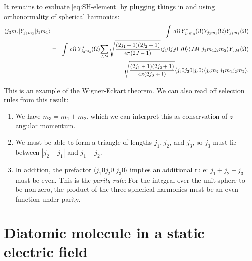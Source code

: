 \documentclass{article}
\theoremstyle{definition}
\newcommand{\nn}{\nonumber}
\newcommand{\f}[2]{\frac{#1}{#2}}
\begin{document}
\noindent It remains to evaluate \eqref{eq:SH-element} by plugging things in and using orthonormality of spherical harmonics:
\begin{eqnarray}
{\langle j_3 m_3| Y_{j_2m_2} |j_1m_1\rangle }
&=& \int \,d\Omega \, Y^*_{j_3m_3}(\Omega) Y_{j_2m_2}(\Omega) Y_{j_1m_1}(\Omega) \nn \\
&=& \int \,d\Omega \, Y^*_{j_3m_3}(\Omega) \textcolor{black}{\sum_{J,M} \sqrt{\f{(2j_1+1)(2j_2+1)}{4\pi(2J+1)}} \langle j_1 0 j_2 0 | J 0  \rangle  \langle J M | j_1 m_1 j_2m_2\rangle Y_{JM}(\Omega)} \nn\\
&=& \sqrt{\f{(2j_1+1)(2j_2+1)}{4\pi(2j_3+1)}} \langle j_1 0 j_2 0 | j_3 0  \rangle  \langle j_3 m_3| j_1 m_1 j_2m_2\rangle.
\end{eqnarray}

\noindent This is an example of the Wigner-Eckart theorem. We can also read off selection rules from this result:
\begin{enumerate}
\item We have $m_3 = m_1 + m_2$, which we can interpret this as conservation of $z$-angular momentum. 
\item We must be able to form a triangle of lengths $j_1$, $j_2$, and $j_3$, so $j_3$ must lie between $| j_2 - j_1 | $ and $j_1 + j_2$.
\item In addition, the prefactor $\langle j_1 0 j_2 0 |  j_3 0 \rangle$ implies an additional rule: $j_1 + j_2 - j_3$ must be even. This is the \textit{parity rule}: For the integral over the unit sphere to be non-zero, the product of the three spherical harmonics must be an even function under parity.
\end{enumerate}



\section{Diatomic molecule in a static electric field}
\end{document}
